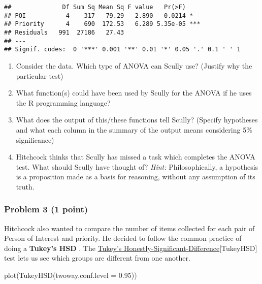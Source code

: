 \documentclass[
]{article}
\newenvironment{Shaded}{\begin{snugshade}}{\end{snugshade}}
\newcommand{\AttributeTok}[1]{\textcolor[rgb]{0.77,0.63,0.00}{#1}}
\newcommand{\FloatTok}[1]{\textcolor[rgb]{0.00,0.00,0.81}{#1}}
\newcommand{\FunctionTok}[1]{\textcolor[rgb]{0.00,0.00,0.00}{#1}}
\newcommand{\NormalTok}[1]{#1}
\providecommand{\tightlist}{%
  \setlength{\itemsep}{0pt}\setlength{\parskip}{0pt}}
\begin{document}
\begin{verbatim}
##              Df Sum Sq Mean Sq F value   Pr(>F)    
## POI           4    317   79.29   2.890   0.0214 *  
## Priority      4    690  172.53   6.289 5.35e-05 ***
## Residuals   991  27186   27.43                     
## ---
## Signif. codes:  0 '***' 0.001 '**' 0.01 '*' 0.05 '.' 0.1 ' ' 1
\end{verbatim}

\begin{enumerate}
\def\labelenumi{\arabic{enumi}.}
\tightlist
\item
  Consider the data. Which type of ANOVA can Scully use? (Justify why
  the particular test)
\item
  What function(s) could have been used by Scully for the ANOVA if he
  uses the R programming language?
\item
  What does the output of this/these functions tell Scully? (Specify
  hypotheses and what each column in the summary of the output means
  considering 5\% significance)
\item
  Hitchcock thinks that Scully has missed a task which completes the
  ANOVA test. What should Scully have thought of? \emph{Hint:}
  Philosophically, a hypothesis is a proposition made as a basis for
  reasoning, without any assumption of its truth.
\end{enumerate}

\hypertarget{problem-3-1-point}{%
\subsubsection{Problem 3 (1 point)}\label{problem-3-1-point}}

Hitchcock also wanted to compare the number of items collected for each
pair of Person of Interest and priority. He decided to follow the common
practice of doing a \textbf{Tukey's HSD} . The
\href{https://www.real-statistics.com/one-way-analysis-of-variance-anova/unplanned-comparisons/tukey-hsd/}{Tukey's
Honestly-Significant-Difference}{[}TukeyHSD{]} test lets us see which
groups are different from one another.

\begin{Shaded}
\begin{Highlighting}[]
\FunctionTok{plot}\NormalTok{(}\FunctionTok{TukeyHSD}\NormalTok{(twoway,}\AttributeTok{conf.level =} \FloatTok{0.95}\NormalTok{))}
\end{Highlighting}
\end{Shaded}
\end{document}
